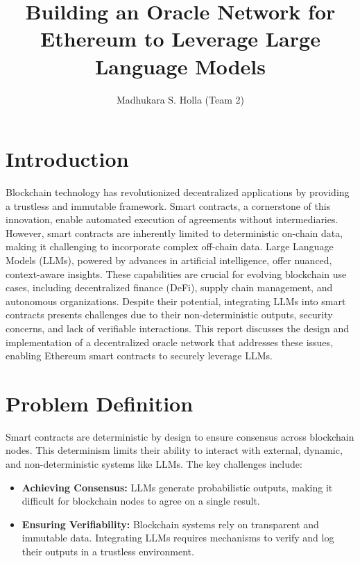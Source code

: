 \documentclass[12pt]{article}
\begin{document}
\title{Building an Oracle Network for Ethereum to Leverage Large Language Models}
\author{Madhukara S. Holla (Team 2)}
\date{}
\maketitle

\section{Introduction}
Blockchain technology has revolutionized decentralized applications by providing a trustless and immutable framework. Smart contracts, a cornerstone of this innovation, enable automated execution of agreements without intermediaries. However, smart contracts are inherently limited to deterministic on-chain data, making it challenging to incorporate complex off-chain data. Large Language Models (LLMs), powered by advances in artificial intelligence, offer nuanced, context-aware insights. These capabilities are crucial for evolving blockchain use cases, including decentralized finance (DeFi), supply chain management, and autonomous organizations. Despite their potential, integrating LLMs into smart contracts presents challenges due to their non-deterministic outputs, security concerns, and lack of verifiable interactions. This report discusses the design and implementation of a decentralized oracle network that addresses these issues, enabling Ethereum smart contracts to securely leverage LLMs.

\section{Problem Definition}
Smart contracts are deterministic by design to ensure consensus across blockchain nodes. This determinism limits their ability to interact with external, dynamic, and non-deterministic systems like LLMs. The key challenges include:

\begin{itemize}
    \item \textbf{Achieving Consensus:} LLMs generate probabilistic outputs, making it difficult for blockchain nodes to agree on a single result.
    \item \textbf{Ensuring Verifiability:} Blockchain systems rely on transparent and immutable data. Integrating LLMs requires mechanisms to verify and log their outputs in a trustless environment.
\end{itemize}
\end{document}
